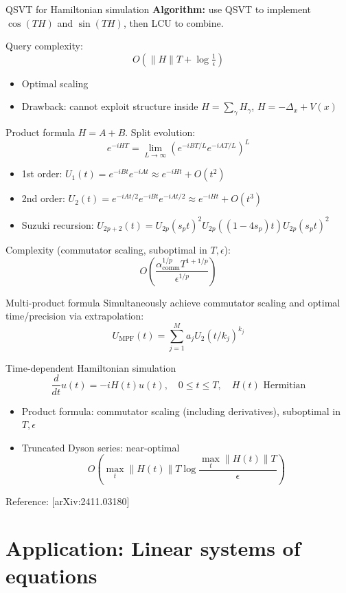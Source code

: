 \documentclass[aspectratio=169]{beamer}
\begin{document}
\begin{frame}{QSVT for Hamiltonian simulation}
\textbf{Algorithm:} use QSVT to implement $\cos(TH)$ and $\sin(TH)$, then LCU to combine.

Query complexity:
$$O\!\left(\|H\|T+\log\tfrac{1}{\epsilon}\right)$$
\begin{itemize}
\item Optimal scaling
\item Drawback: cannot exploit structure inside $H=\sum_\gamma H_\gamma$, $H=-\Delta_x+V(x)$
\end{itemize}
\end{frame}

\begin{frame}{Product formula}
$H=A+B$. Split evolution:
$$e^{-iHT}=\lim_{L\to\infty}\left(e^{-iBT/L}e^{-iAT/L}\right)^L$$
\begin{itemize}
\item 1st order: $U_1(t)=e^{-iBt}e^{-iAt}\approx e^{-iHt}+O(t^2)$
\item 2nd order: $U_2(t)=e^{-iAt/2}e^{-iBt}e^{-iAt/2}\approx e^{-iHt}+O(t^3)$
\item Suzuki recursion: $U_{2p+2}(t)=U_{2p}(s_pt)^2U_{2p}((1-4s_p)t)U_{2p}(s_pt)^2$
\end{itemize}
Complexity (commutator scaling, suboptimal in $T,\epsilon$):
$$O\!\left(\frac{\alpha_{\mathrm{comm}}^{1/p}T^{1+1/p}}{\epsilon^{1/p}}\right)$$
\end{frame}

\begin{frame}{Multi-product formula}
Simultaneously achieve commutator scaling and optimal time/precision via extrapolation:
$$U_{\mathrm{MPF}}(t)=\sum_{j=1}^M a_j U_2(t/k_j)^{k_j}$$
\end{frame}

\begin{frame}{Time-dependent Hamiltonian simulation}
$$\frac{d}{dt}u(t)=-iH(t)u(t),\quad 0\le t\le T,\quad H(t)\text{ Hermitian}$$
\begin{itemize}
\item Product formula: commutator scaling (including derivatives), suboptimal in $T,\epsilon$
\item Truncated Dyson series: near-optimal
$$O\!\left(\max_t\|H(t)\|T\log\frac{\max_t\|H(t)\|T}{\epsilon}\right)$$
\end{itemize}
Reference: [arXiv:2411.03180]
\end{frame}

\section{Application: Linear systems of equations}
\begin{frame}\sectionpage\end{frame}
\end{document}
